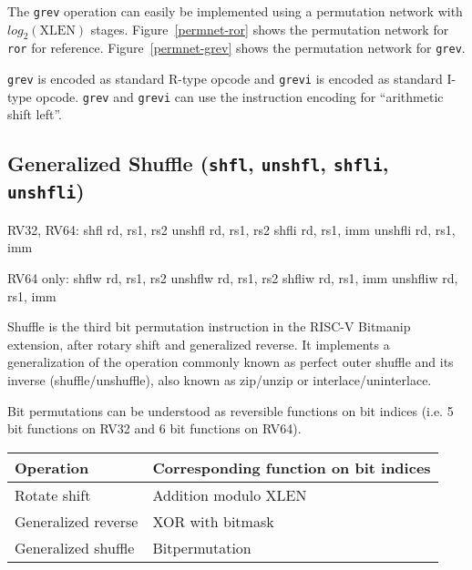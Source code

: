 The {\tt grev} operation can easily be implemented using a permutation
network with $log_2(\textrm{XLEN})$ stages. Figure~\ref{permnet-ror}
shows the permutation network for {\tt ror} for reference.
Figure~\ref{permnet-grev} shows the permutation network for {\tt grev}.

\texttt{grev} is encoded as standard R-type opcode and \texttt{grevi} is
encoded as standard I-type opcode. \texttt{grev} and \texttt{grevi} can
use the instruction encoding for ``arithmetic shift left''.

%
%
%


\subsection{Generalized Shuffle (\texttt{shfl}, \texttt{unshfl}, \texttt{shfli}, \texttt{unshfli})}
\label{gzip}

\begin{rvb}
  RV32, RV64:
    shfl    rd, rs1, rs2
    unshfl  rd, rs1, rs2
    shfli   rd, rs1, imm
    unshfli rd, rs1, imm

  RV64 only:
    shflw    rd, rs1, rs2
    unshflw  rd, rs1, rs2
    shfliw   rd, rs1, imm
    unshfliw rd, rs1, imm
\end{rvb}

Shuffle is the third bit permutation instruction in the RISC-V Bitmanip
extension, after rotary shift and generalized reverse. It implements a
generalization of the operation commonly known as perfect outer shuffle and its
inverse (shuffle/unshuffle), also known as zip/unzip or interlace/uninterlace.

Bit permutations can be understood as reversible functions on bit indices (i.e.
5 bit functions on RV32 and 6 bit functions on RV64).

\begin{center}
\begin{tabular}{l l}
Operation & Corresponding function on bit indices \\
\hline
Rotate shift & Addition modulo {\rm XLEN} \\
Generalized reverse & XOR with bitmask \\
Generalized shuffle & Bitpermutation \\
\end{tabular}
\end{center}

